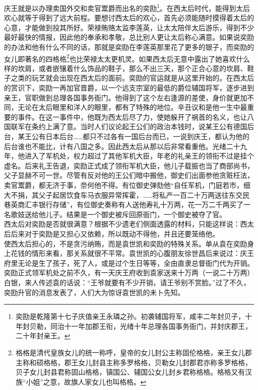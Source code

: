 庆王就是以办理卖国外交和卖官鬻爵而出名的奕劻\footnote{奕劻是乾隆第十七子庆值亲王永璘之孙。初袭辅国将军，咸丰二年封贝子，十年封贝勒，同治十一年加郡王衔，光绪十年总理各国事务衙门，并封庆郡王，二十年封亲王。}。在西太后时代，能得到太后欢心就等于得到了远大前程。要想讨西太后的欢心，首先必须能随时摸得着太后的心意，才能做到投其所好。荣禄贿赂太监李莲英，让太太陪伴太后游乐，得到不少最好最快的情报，因此他的奉承和孝敬，总比别人更让太后称心满意。如果说奕劻的办法和他有什么不同的话，那就是奕劻在李莲英那里花了更多的银子，而奕劻的女儿即著名的四格格\footnote{格格是清代皇族女儿的统一称呼，皇帝的女儿封公主称固伦格格，亲王女儿郡主称和硕格格，郡王女儿封县主称多罗格格，贝勒女儿封郡君亦称多罗格格，贝子女儿封县君称固山格格，镇国公、辅国公女儿封乡君称格格。格格又有汉族“小姐”之意，故旗人家女儿也叫格格。}也比荣禄太太更机灵。如果西太后无意中露出了她喜欢什么样的坎肩，或者嵌镶着什么饰品的鞋子，那么不出三天，那个正合心意的坎肩、鞋子之类的玩艺就会出现在西太后的面前。奕劻的官运就是从这里开始的。在西太后的赏识下，奕劻一再加官晋爵，以一个远支宗室的最低的爵位辅国将军，逐步进到亲王，官职做到总理各国事务衙门。他得到了这个左右逢源的差使，身价就更加不同，无论在太后眼里和洋人的眼里，都有了特殊的地位。辛丑议和是他一生中最重要的事件。在这一事件中，他既为西太后尽了力，使她躲开了祸首的名义，也让八国联军在条约上满了意。当时人们议论起王公们的政治本钱时，说某王公有德国后台，某王公有日本后台……都只不过各有一国后台而已，一说到庆王，都认为他的后台谁也不能比，计有八国之多。因此西太后从那以后非常看重他。光绪二十九年，他进入了军机处，权力超过了其他军机大臣，年老的礼亲王的领衔不过是挂个虚名。后来礼王告退，奕劻正式成了领衔军机大臣，他儿子载振也当了商部尚书，父子显赫不可一世。尽管有反对他的王公们暗中搬他，御史们出面参他贪赃枉法，卖官鬻爵，都无济于事，奈何他不得。有位御史弹劾他“自任军机，门庭若市，细大不捐，其父子起居饮食车马衣服异常挥霍，……将私产一百二十万两送往东交民巷英商汇丰银行存储”，有位御史奏称有人送他寿礼十万两，花一万二千两买了一名歌妓送给他儿子。结果是一个御史被斥回原衙门，一个御史被夺了官。\\

西太后对奕劻是否就很满意？根据不少遗老们侧面透露的材料，只能这样说：西太后后来对于奕劻是又担心又依赖，所以既动不得他，并且还要笼络他。\\

使西太后担心的，不是贪污纳贿，而是袁世凯和奕劻的特殊关系。单从袁在奕劻身上花钱的情形来看，那关系就很不平常。袁世凯的心腹朋友徐世昌后来说过：庆王府里无论是生了孩子，死了人，或是过个生日等等，全由直隶总督衙门代为开销。奕劻正式领军机处之前不久，有一天庆王府收到袁家送来十万两（一说二十万两）白银，来人传述袁的话说：“王爷就要有不少开销，请王爷别不赏脸。”过了不久，奕劻升官的消息发表了，人们大为惊讶袁世凯的未卜先知。\\

